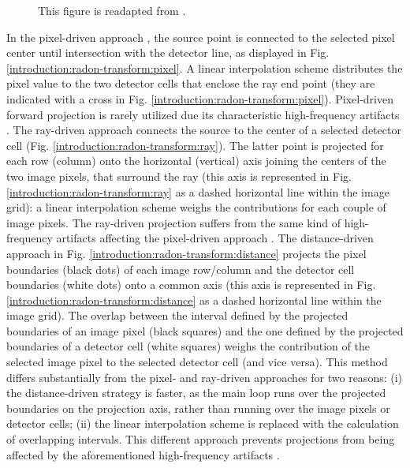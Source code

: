 {\begin{figure}[!b]
{              This figure is readapted from \cite{Deman2004}.
              }%
    \label{introduction:radon-transform:pixel-ray-distance}%
\end{figure}
In the pixel-driven approach \cite{Herman2009}, the source point is connected to the selected pixel center until intersection
with the detector line, as displayed in Fig. \ref{introduction:radon-transform:pixel}. A linear
interpolation scheme distributes the pixel value to the two detector cells that enclose the ray end point (they are indicated with a cross in Fig. \ref{introduction:radon-transform:pixel}). 
Pixel-driven forward projection is rarely utilized due its characteristic high-frequency artifacts \cite{Zeng1993}.
\newline
The ray-driven approach \cite{Joseph1982} connects the source to the center of a selected detector cell (Fig. \ref{introduction:radon-transform:ray}).
The latter point is projected for each row (column) onto the horizontal (vertical) axis joining the centers of the two image pixels, that surround the ray (this axis
is represented in Fig. \ref{introduction:radon-transform:ray} as a dashed horizontal line within the image grid): 
a linear interpolation scheme weighs the contributions for each couple of image pixels. The ray-driven projection suffers from the same kind of high-frequency 
artifacts affecting the pixel-driven approach \cite{DeMan2002}.
\newline
The distance-driven approach \cite{DeMan2002,Deman2004} in Fig. \ref{introduction:radon-transform:distance}
projects the pixel boundaries (black dots) of each image row/column and
the detector cell boundaries (white dots) onto a common axis
(this axis
is represented in Fig. \ref{introduction:radon-transform:distance} as a dashed horizontal line within the image grid).
The overlap between the interval defined by the projected boundaries of an image pixel (black squares)
and the one defined by the projected boundaries
of a detector cell (white squares) weighs the contribution of the selected image pixel to the selected detector cell (and vice versa).
This method differs substantially from the pixel- and ray-driven
approaches for two reasons:
(i) the distance-driven strategy is faster, as the main loop runs over the projected boundaries on the projection axis,
rather than running over the image pixels or detector cells; (ii) 
the linear interpolation scheme is replaced with the calculation of overlapping intervals. This different approach prevents projections
from being affected by the aforementioned high-frequency artifacts \cite{DeMan2002,Deman2004}.


}
